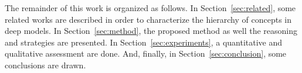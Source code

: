 The remainder of this work is organized as follows. In Section~\ref{sec:related}, some related works are described in order to characterize the hierarchy of concepts in deep models. In Section~\ref{sec:method}, the proposed method as well the reasoning and strategies are presented. In Section~\ref{sec:experiments}, a quantitative and qualitative assessment are done. And, finally, in Section~\ref{sec:conclusion}, some conclusions are drawn.


